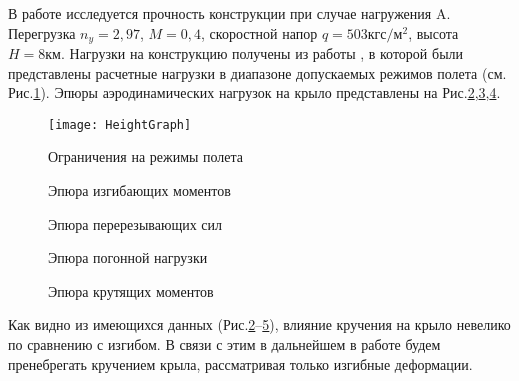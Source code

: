 В работе исследуется прочность конструкции при случае нагружения A. Перегрузка $n_y = 2,97$, $M = 0,4$, скоростной напор $q = 503 \text{кгс}/\text{м}^2$, высота $H = 8\text{км}$. Нагрузки на конструкцию получены из работы \cite{BPS}, в которой были представлены расчетные нагрузки в диапазоне допускаемых режимов полета (см. Рис.\ref{fig:ModeOfFlight}). 
Эпюры аэродинамических нагрузок на крыло представлены на Рис.\ref{fig:BendingMoments},\ref{fig:CuttingForces},\ref{fig:DistributedLoad}.



\begin{figure}[H]
\centering
\texttt{[image: HeightGraph]}
\caption{Ограничения на режимы полета}
\label{fig:ModeOfFlight}
\end{figure}


\begin{figure}[H]
\centering
\def\svgwidth{0.9\textwidth}

\caption{Эпюра изгибающих моментов}
\label{fig:BendingMoments}
\end{figure}

\begin{figure}[H]
\centering
\def\svgwidth{0.9\textwidth}

\caption{Эпюра перерезывающих сил}
\label{fig:CuttingForces}
\end{figure}

\begin{figure}[H]
\centering
\def\svgwidth{0.9\textwidth}

\caption{Эпюра погонной нагрузки}
\label{fig:DistributedLoad}
\end{figure}

\begin{figure}[H]
\centering
\def\svgwidth{0.9\textwidth}

\caption{Эпюра крутящих моментов}
\label{fig:RotatingMoments}
\end{figure}


Как видно из имеющихся данных (Рис.\ref{fig:BendingMoments}--\ref{fig:RotatingMoments}), влияние кручения на крыло невелико по сравнению с изгибом. В связи с этим в дальнейшем в работе будем пренебрегать кручением крыла, рассматривая только изгибные деформации. 

